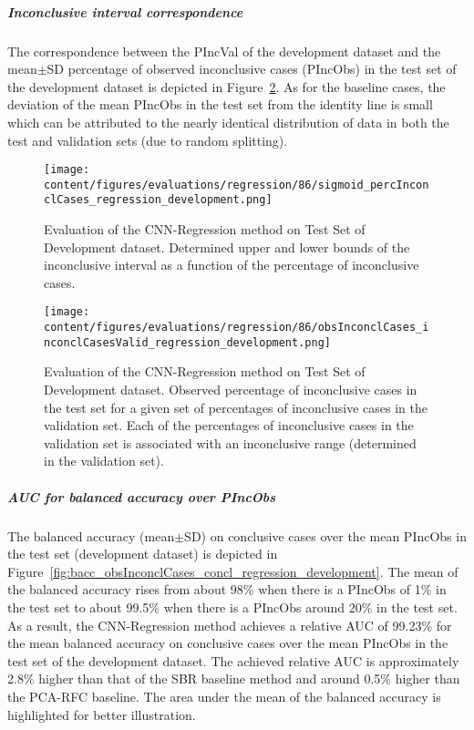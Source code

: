 \subparagraph{Inconclusive interval correspondence}

The correspondence between the PIncVal of the development dataset 
and the mean$\pm$SD percentage of observed inconclusive cases (PIncObs) in the test set of the development dataset 
is depicted in Figure~\ref{fig:obsInconclCases_inconclCasesValid_regression_development}.
As for the baseline cases, the deviation of the mean PIncObs in the test set from the 
identity line is small which can be attributed to the nearly identical distribution of data in both the test and validation sets 
(due to random splitting).

\begin{figure}[ht]
  \centering
  \texttt{[image: content/figures/evaluations/regression/86/sigmoid\_percInconclCases\_regression\_development.png]}
  \caption{Evaluation of the CNN-Regression method on Test Set of Development dataset. 
  Determined upper and lower bounds of the inconclusive interval as a function of the percentage of inconclusive cases.} 
  \label{fig:regression_percInconclCases_development}
\end{figure}


\begin{figure}[ht]
  \centering
  \texttt{[image: content/figures/evaluations/regression/86/obsInconclCases\_inconclCasesValid\_regression\_development.png]}
  \caption{Evaluation of the CNN-Regression method on Test Set of Development dataset.
  Observed percentage of inconclusive cases in the test set 
  for a given set of percentages of inconclusive cases in the validation set.
  Each of the percentages of inconclusive cases in the validation set is associated 
  with an inconclusive range (determined in the validation set).} 
  \label{fig:obsInconclCases_inconclCasesValid_regression_development}
\end{figure} 


\subparagraph{AUC for balanced accuracy over PIncObs}

The balanced accuracy (mean$\pm$SD) on conclusive cases over the mean PIncObs in the test set (development dataset) 
is depicted in Figure~\ref{fig:bacc_obsInconclCases_concl_regression_development}.
The mean of the balanced accuracy rises from about 98\% when there is a PIncObs of 1\% in the test set 
to about 99.5\% when there is a PIncObs around 20\% in the test set.
As a result, the CNN-Regression method achieves a relative AUC of 99.23\% for the mean balanced accuracy on conclusive cases
over the mean PIncObs in the test set of the development dataset.
The achieved relative AUC is approximately 2.8\% higher than that of the SBR baseline method 
and around 0.5\% higher than the PCA-RFC baseline.
The area under the mean of the balanced accuracy is highlighted for better illustration.


